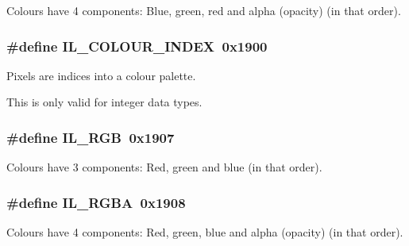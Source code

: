 Colours have 4 components\+: Blue, green, red and alpha (opacity) (in that order). 

\hypertarget{group__il__data__formats_ga2d5d7096248447f2ee131af82814392a}{
\subsubsection[{I\+L\+\_\+\+C\+O\+L\+O\+U\+R\+\_\+\+I\+N\+D\+E\+X}]{\setlength{\rightskip}{0pt plus 5cm}\#define I\+L\+\_\+\+C\+O\+L\+O\+U\+R\+\_\+\+I\+N\+D\+E\+X~0x1900}}\label{group__il__data__formats_ga2d5d7096248447f2ee131af82814392a}


Pixels are indices into a colour palette. 

This is only valid for integer data types. \hypertarget{group__il__data__formats_ga7887e132189ba7764bf37f3e08bb27ae}{
\subsubsection[{I\+L\+\_\+\+R\+G\+B}]{\setlength{\rightskip}{0pt plus 5cm}\#define I\+L\+\_\+\+R\+G\+B~0x1907}}\label{group__il__data__formats_ga7887e132189ba7764bf37f3e08bb27ae}


Colours have 3 components\+: Red, green and blue (in that order). 

\hypertarget{group__il__data__formats_ga79b9ca197717185124861531cd40ea36}{
\subsubsection[{I\+L\+\_\+\+R\+G\+B\+A}]{\setlength{\rightskip}{0pt plus 5cm}\#define I\+L\+\_\+\+R\+G\+B\+A~0x1908}}\label{group__il__data__formats_ga79b9ca197717185124861531cd40ea36}


Colours have 4 components\+: Red, green, blue and alpha (opacity) (in that order). 

